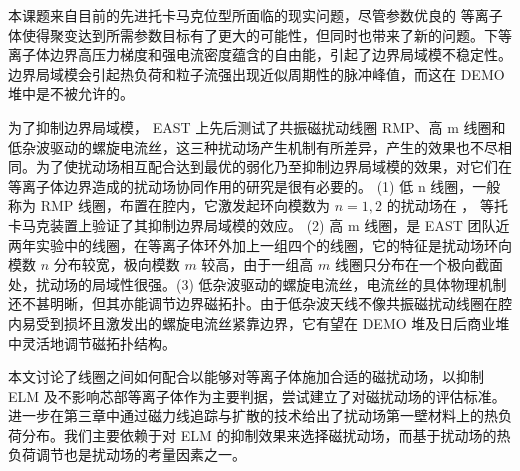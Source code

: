 \begin{cabstract}
  本课题来自目前的先进托卡马克位型所面临的现实问题，尽管参数优良的 \Hmode 等离子体使得聚变达到所需参数目标有了更大的可能性，但同时也带来了新的问题。\Hmode 下等离子体边界高压力梯度和强电流密度蕴含的自由能，引起了边界局域模不稳定性。边界局域模会引起热负荷和粒子流强出现近似周期性的脉冲峰值，而这在 DEMO 堆中是不被允许的。

  为了抑制边界局域模， EAST 上先后测试了共振磁扰动线圈 RMP、高 m 线圈和低杂波驱动的螺旋电流丝，这三种扰动场产生机制有所差异，产生的效果也不尽相同。为了使扰动场相互配合达到最优的弱化乃至抑制边界局域模的效果，对它们在等离子体边界造成的扰动场协同作用的研究是很有必要的。 (1) 低 n 线圈，一般称为 RMP 线圈，布置在腔内，它激发起环向模数为 $n=1,2$ 的扰动场在 \east， \ddd 等托卡马克装置上验证了其抑制边界局域模的效应。 (2) 高 m 线圈，是 EAST 团队近两年实验中的线圈，在等离子体环外加上一组四个的线圈，它的特征是扰动场环向模数 $n$ 分布较宽，极向模数 $m$ 较高，由于一组高 $m$ 线圈只分布在一个极向截面处，扰动场的局域性很强。(3) 低杂波驱动的螺旋电流丝，电流丝的具体物理机制还不甚明晰，但其亦能调节边界磁拓扑。由于低杂波天线不像共振磁扰动线圈在腔内易受到损坏且激发出的螺旋电流丝紧靠边界，它有望在 DEMO 堆及日后商业堆中灵活地调节磁拓扑结构。
  
  本文讨论了线圈之间如何配合以能够对等离子体施加合适的磁扰动场，以抑制 ELM 及不影响芯部等离子体作为主要判据，尝试建立了对磁扰动场的评估标准。进一步在第三章中通过磁力线追踪与扩散的技术给出了扰动场第一壁材料上的热负荷分布。我们主要依赖于对 ELM 的抑制效果来选择磁扰动场，而基于扰动场的热负荷调节也是扰动场的考量因素之一。%

\end{cabstract}


